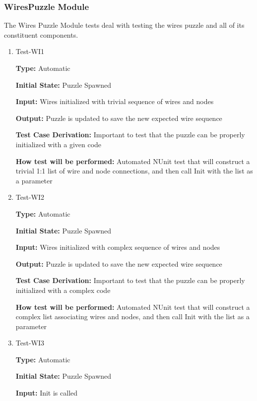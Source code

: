 \documentclass[12pt, titlepage]{article}
\begin{document}
\subsubsection{WiresPuzzle Module}
The Wires Puzzle Module tests deal with testing the wires puzzle and all of its constituent components.

\begin{enumerate}

 \item{Test-WI1\\}

 \textbf{Type:} Automatic
					
 \textbf{Initial State:} Puzzle Spawned
					
 \textbf{Input:} Wires initialized with trivial sequence of wires and nodes
					
 \textbf{Output:} Puzzle is updated to save the new expected wire sequence

 \textbf{Test Case Derivation:} Important to test that the puzzle can be properly initialized with a given code

 \textbf{How test will be performed:} Automated NUnit test that will construct a trivial 1:1 list of wire and node connections, and then call Init with the list as a parameter

 \item{Test-WI2\\}

 \textbf{Type:} Automatic
					
 \textbf{Initial State:} Puzzle Spawned
					
 \textbf{Input:} Wires initialized with complex sequence of wires and nodes
					
 \textbf{Output:} Puzzle is updated to save the new expected wire sequence

 \textbf{Test Case Derivation:} Important to test that the puzzle can be properly initialized with a complex code

 \textbf{How test will be performed:} Automated NUnit test that will construct a complex list associating wires and nodes, and then call Init with the list as a parameter

 \item{Test-WI3\\}

 \textbf{Type:} Automatic
					
 \textbf{Initial State:} Puzzle Spawned
					
 \textbf{Input:} Init is called
					

\end{enumerate}
\end{document}
